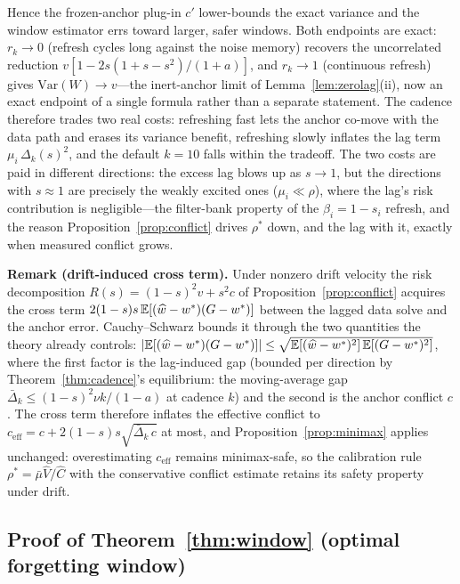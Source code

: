 Hence the frozen-anchor plug-in $c'$ lower-bounds the exact variance and the window estimator errs toward larger, safer windows.
Both endpoints are exact: $r_k \to 0$ (refresh cycles long against the noise memory) recovers the uncorrelated reduction $v[1 - 2s(1+s-s^2)/(1+a)]$, and $r_k \to 1$ (continuous refresh) gives $\mathrm{Var}(W) \to v$---the inert-anchor limit of Lemma~\ref{lem:zerolag}(ii), now an exact endpoint of a single formula rather than a separate statement.
The cadence therefore trades two real costs: refreshing fast lets the anchor co-move with the data path and erases its variance benefit, refreshing slowly inflates the lag term $\mu_i\,\Delta_k(s)^2$, and the default $k = 10$ falls within the tradeoff.
The two costs are paid in different directions: the excess lag blows up as $s \to 1$, but the directions with $s \approx 1$ are precisely the weakly excited ones ($\mu_i \ll \rho$), where the lag's risk contribution is negligible---the filter-bank property of the $\beta_i = 1 - s_i$ refresh, and the reason Proposition~\ref{prop:conflict} drives $\rho^*$ down, and the lag with it, exactly when measured conflict grows.

\medskip
\noindent\textbf{Remark (drift-induced cross term).}
Under nonzero drift velocity the risk decomposition $R(s) = (1-s)^2 v + s^2 c$ of Proposition~\ref{prop:conflict} acquires the cross term $2(1-s)s\,\mathbb{E}[(\widehat w - w^*)(G - w^*)]$ between the lagged data solve and the anchor error.
Cauchy--Schwarz bounds it through the two quantities the theory already controls: $|\mathbb{E}[(\widehat w - w^*)(G - w^*)]| \le \sqrt{\mathbb{E}[(\widehat w - w^*)^2]\,\mathbb{E}[(G - w^*)^2]}$, where the first factor is the lag-induced gap (bounded per direction by Theorem~\ref{thm:cadence}'s equilibrium: the moving-average gap $\bar\Delta_k \le (1-s)^2\nu k/(1-a)$ at cadence $k$) and the second is the anchor conflict $c$.
The cross term therefore inflates the effective conflict to $c_{\mathrm{eff}} = c + 2(1-s)s\sqrt{\bar\Delta_k\,c}$ at most, and Proposition~\ref{prop:minimax} applies unchanged: overestimating $c_{\mathrm{eff}}$ remains minimax-safe, so the calibration rule $\rho^* = \bar\mu \widehat V / \widehat C$ with the conservative conflict estimate retains its safety property under drift.

\subsection{Proof of Theorem~\ref{thm:window} (optimal forgetting window)}
\label{app:proof-window}

